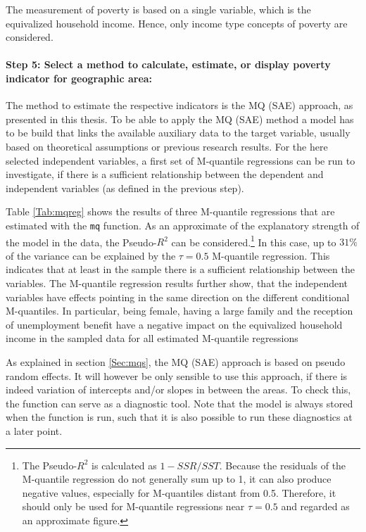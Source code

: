 The measurement of poverty is based on a single variable, which is the equivalized household income. Hence, only income type concepts of poverty are considered. 

\paragraph{Step 5: Select a method to calculate, estimate, or display poverty indicator for geographic area:}

The method to estimate the respective indicators is the MQ (SAE) approach, as presented in this thesis. 
To be able to apply the MQ (SAE) method a model has to be build that links the available auxiliary data to the target variable, usually based on theoretical assumptions or previous research results.  For the here selected independent variables, a first set of M-quantile regressions can be run to investigate, if there is a sufficient relationship between the dependent and independent variables (as defined in the previous step). 



Table \ref{Tab:mqreg} shows the results of three M-quantile regressions that are estimated with  the \texttt{mq} function. As an approximate of the explanatory strength of the model in the data, the  Pseudo-$R^2$ can be considered.\footnote{The Pseudo-$R^2$ is calculated as $1-SSR/SST$. Because the residuals of the M-quantile regression do not generally sum up to 1, it can also produce negative values, especially for M-quantiles distant from 0.5. Therefore, it should only be used  for M-quantile regressions near $\tau = 0.5$ and regarded as an approximate figure.} In this case, up to $31\%$ of the variance can be explained by the  $\tau = 0.5$ M-quantile regression. This indicates that at least in the sample there is a sufficient relationship between the variables.
The M-quantile regression results further show, that the independent variables have effects pointing in the same direction on the different conditional M-quantiles. In particular, being female, having a large family and the reception of unemployment benefit have a negative impact on the equivalized household income in the sampled data for all estimated M-quantile regressions

As explained in section \ref{Sec:mqs}, the MQ (SAE) approach is based on pseudo random effects. It will however be only sensible to use this approach, if there is indeed variation of intercepts and/or slopes in between the areas. 
To check this, the  function can serve as a diagnostic tool. Note that the  model is always stored when the  function is run, such that it is also possible to run these diagnostics at a later point. 

